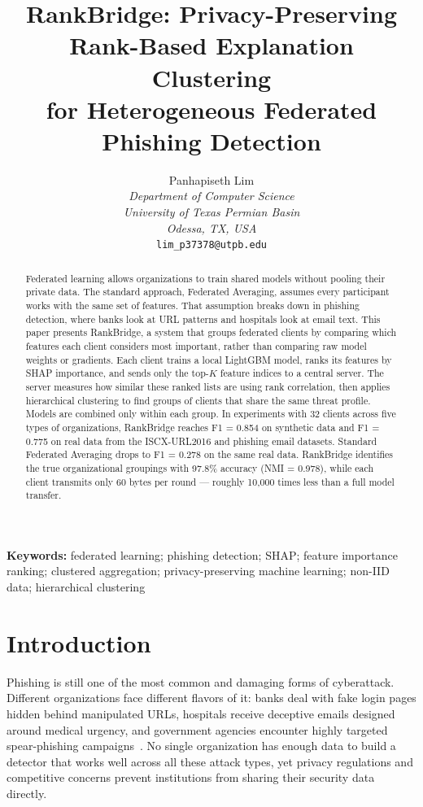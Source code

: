 \documentclass[12pt,a4paper]{article}
\title{\textbf{RankBridge: Privacy-Preserving Rank-Based Explanation Clustering\\for Heterogeneous Federated Phishing Detection}}
\author{
  Panhapiseth Lim \\
  \textit{Department of Computer Science} \\
  \textit{University of Texas Permian Basin} \\
  \textit{Odessa, TX, USA} \\
  \texttt{lim\_p37378@utpb.edu}
}
\date{}
\begin{document}
\maketitle

\begin{abstract}
Federated learning allows organizations to train shared models without pooling their private data. The standard approach, Federated Averaging, assumes every participant works with the same set of features. That assumption breaks down in phishing detection, where banks look at URL patterns and hospitals look at email text. This paper presents RankBridge, a system that groups federated clients by comparing which features each client considers most important, rather than comparing raw model weights or gradients. Each client trains a local LightGBM model, ranks its features by SHAP importance, and sends only the top-$K$ feature indices to a central server. The server measures how similar these ranked lists are using rank correlation, then applies hierarchical clustering to find groups of clients that share the same threat profile. Models are combined only within each group. In experiments with 32 clients across five types of organizations, RankBridge reaches F1 = 0.854 on synthetic data and F1 = 0.775 on real data from the ISCX-URL2016 and phishing email datasets. Standard Federated Averaging drops to F1 = 0.278 on the same real data. RankBridge identifies the true organizational groupings with 97.8\% accuracy (NMI = 0.978), while each client transmits only 60 bytes per round --- roughly 10{,}000 times less than a full model transfer.
\end{abstract}

\noindent\textbf{Keywords:} federated learning; phishing detection; SHAP; feature importance ranking; clustered aggregation; privacy-preserving machine learning; non-IID data; hierarchical clustering

\section{Introduction}\label{sec:introduction}

Phishing is still one of the most common and damaging forms of cyberattack. Different organizations face different flavors of it: banks deal with fake login pages hidden behind manipulated URLs, hospitals receive deceptive emails designed around medical urgency, and government agencies encounter highly targeted spear-phishing campaigns~\cite{salloum2022phishing}. No single organization has enough data to build a detector that works well across all these attack types, yet privacy regulations and competitive concerns prevent institutions from sharing their security data directly.
\end{document}
